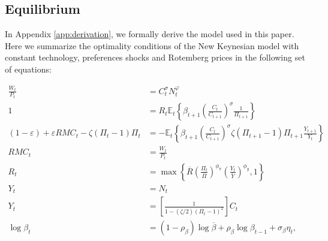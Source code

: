 \documentclass[11pt]{article}
\numberwithin{equation}{section}
\begin{document}
\subsection{Equilibrium}\label{sec:model_equilibrium}

In Appendix \ref{app:derivation}, we formally derive the model used in this paper. Here we summarize the optimality conditions of the New Keynesian model with constant technology, preferences shocks and Rotemberg prices in the following set of equations:

\begin{align}
	\frac{W_t}{P_t}&=C_t^{\sigma}N_t^{\varphi}\label{eq:m_intra}\\
	1&=R_t\mathbb{E}_t\left\{\beta_{t+1}\left(\frac{C_t}{C_{t+1}}\right)^{\sigma}\frac{1}{\Pi_{t+1}}\right\}\label{eq:m_euler}\\
	(1-\varepsilon)+\varepsilon RMC_t-\zeta(\Pi_t-1)\Pi_t&=-\mathbb{E}_t\left\{\beta_{t+1}\left(\frac{C_t}{C_{t+1}}\right)^{\sigma}\zeta(\Pi_{t+1}-1)\Pi_{t+1}\frac{Y_{t+1}}{Y_t}\right\}\label{eq:m_pricing}\\
	RMC_t&=\frac{W_t}{P_t}\label{eq:m_rmc}\\
	R_t&=\max\left\{\overline R\left(\frac{\Pi_t}{\overline\Pi}\right)^{\phi_{\pi}}\left(\frac{Y_t}{\overline{Y}}\right)^{\phi_{y}},1\right\}\label{eq:m_taylor}\\
	Y_t&=N_t\label{eq:m_product}\\
	Y_t&=\left[\frac{1}{1-(\zeta/2)(\Pi_t-1)^2}\right]C_t\label{eq:m_aggregate}\\
	\log \beta_t&=(1-\rho_{\beta})\log\overline\beta+\rho_{\beta}\log \beta_{t-1}+\sigma_{\beta}\eta_t,\label{eq:m_ar1_b}
\end{align}
\end{document}
